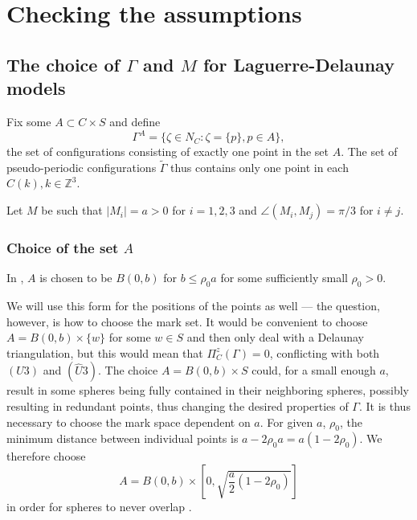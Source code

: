\section{Checking the assumptions}

\subsection{The choice of $\Gamma$ and $M$ for Laguerre-Delaunay models}
Fix some $A \subset C\times S$ and define
$$\Gamma^A = \{\zeta \in N_C: \zeta = \{p\}, p \in A\},$$
the set of configurations consisting of exactly one point in the set $A$. The set of pseudo-periodic configurations $\tilde\Gamma$ thus contains only one point in each $C(k), k\in\mathbb Z^3$.

Let $M$ be such that $|M_i| = a > 0$ for $i=1,2,3$ and $\angle(M_i,M_j) = \pi / 3$ for $i\neq j$.

\subsubsection{Choice of the set $A$}
In \cite{DDG12}, $A$ is chosen to be $B(0,b)$ for $b\leq \rho_0 a$ for some  sufficiently small $\rho_0 >0$. 

We will use this form for the positions of the points as well --- the question, however, is how to choose the mark set. It would be convenient to choose $A=B(0,b)\times\{w\}$ for some $w\in S$ and then only deal with a Delaunay triangulation, but this  would mean that $\Pi^z_C(\Gamma) = 0$, conflicting with both $(U3)$ and $(\hat U3)$. The choice $A=B(0,b)\times S$ could, for a small enough $a$, result in some spheres being fully contained in their neighboring spheres, possibly resulting in redundant points, thus changing the desired properties of $\Gamma$. It is thus necessary to choose the mark space dependent on $a$. For given $a$, $\rho_0$, the minimum distance between individual points is $a-2\rho_0 a = a(1-2\rho_0)$. We therefore choose 
$$A = B(0,b)\times \left[0, \sqrt{\frac a2(1-2\rho_0)}\right]$$ 
in order for spheres to never overlap . 




